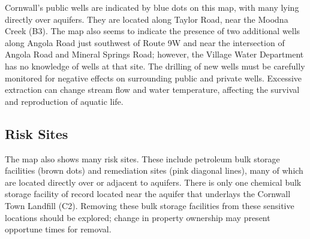 Cornwall's public wells are indicated by blue dots on this map, with many lying 
directly over aquifers. They are located along Taylor Road, near the Moodna 
Creek (B3). The map also seems to indicate the presence of two additional wells 
along Angola Road just southwest of Route 9W and near the intersection of Angola 
Road and Mineral Springs Road; however, the Village Water Department has no 
knowledge of wells at that site. The drilling of new wells must be carefully 
monitored for negative effects on surrounding public and private wells. 
Excessive extraction can change stream flow and water temperature, affecting the 
survival and reproduction of aquatic life.

\subsection*{Risk Sites}\label{subsec:risksites}
The map also shows many risk sites. These include petroleum bulk storage 
facilities (brown dots) and remediation sites (pink diagonal lines), many of 
which are located directly over or adjacent to aquifers. There is only one 
chemical bulk storage facility of record located near the aquifer that 
underlays the Cornwall Town Landfill (C2). Removing these bulk storage 
facilities from these sensitive locations should be explored; change in property 
ownership may present opportune times for removal.

